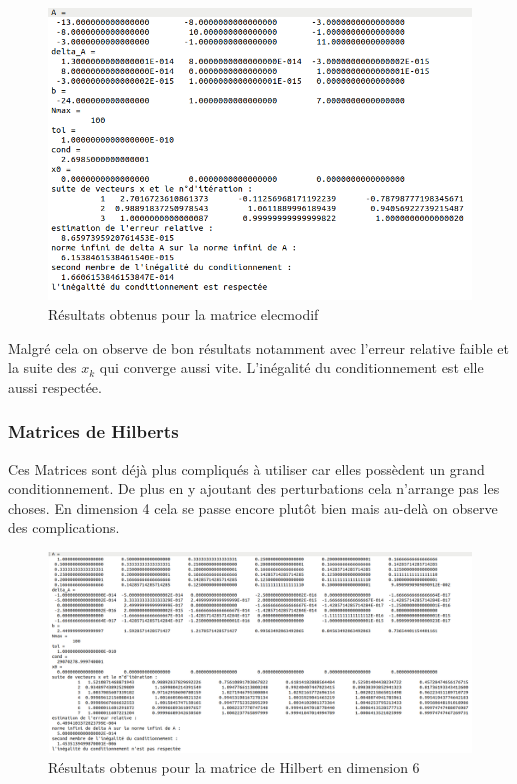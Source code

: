 \documentclass[12,french]{report}
\begin{document}
\begin{figure}[H]
	\centering
	\includegraphics[width=1\textwidth]{./Images/elecmodif_1.res}
	\caption{Résultats obtenus pour la matrice elecmodif}
\end{figure}

Malgré cela on observe de bon résultats notamment avec l'erreur relative faible et la suite des $x_{k}$ qui converge aussi vite. L'inégalité du conditionnement est elle aussi respectée.

\subsubsection{Matrices de Hilberts}

Ces Matrices sont déjà plus compliqués à utiliser car elles possèdent un grand conditionnement. De plus en y ajoutant des perturbations cela n'arrange pas les choses. En dimension 4 cela se passe encore plutôt bien mais au-delà on observe des complications.

\begin{figure}[H]
	\centering
	\includegraphics[width=1\textwidth]{./Images/H_6_1.res}
	\caption{Résultats obtenus pour la matrice de Hilbert en dimension 6 }
\end{figure}
\end{document}
